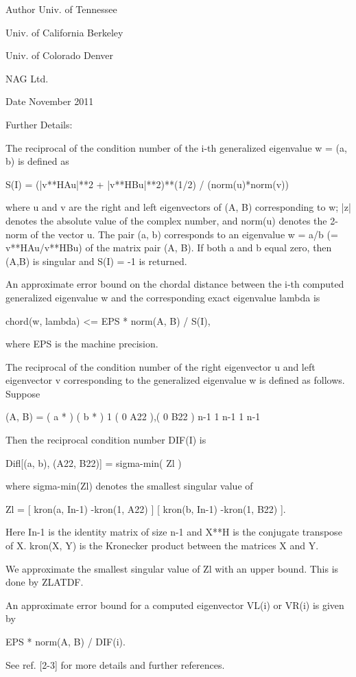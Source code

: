 \begin{DoxyAuthor}{Author}
Univ. of Tennessee 

Univ. of California Berkeley 

Univ. of Colorado Denver 

N\+A\+G Ltd. 
\end{DoxyAuthor}
\begin{DoxyDate}{Date}
November 2011 
\end{DoxyDate}
\begin{DoxyParagraph}{Further Details\+: }
\begin{DoxyVerb}  The reciprocal of the condition number of the i-th generalized
  eigenvalue w = (a, b) is defined as

          S(I) = (|v**HAu|**2 + |v**HBu|**2)**(1/2) / (norm(u)*norm(v))

  where u and v are the right and left eigenvectors of (A, B)
  corresponding to w; |z| denotes the absolute value of the complex
  number, and norm(u) denotes the 2-norm of the vector u. The pair
  (a, b) corresponds to an eigenvalue w = a/b (= v**HAu/v**HBu) of the
  matrix pair (A, B). If both a and b equal zero, then (A,B) is
  singular and S(I) = -1 is returned.

  An approximate error bound on the chordal distance between the i-th
  computed generalized eigenvalue w and the corresponding exact
  eigenvalue lambda is

          chord(w, lambda) <=   EPS * norm(A, B) / S(I),

  where EPS is the machine precision.

  The reciprocal of the condition number of the right eigenvector u
  and left eigenvector v corresponding to the generalized eigenvalue w
  is defined as follows. Suppose

                   (A, B) = ( a   *  ) ( b  *  )  1
                            ( 0  A22 ),( 0 B22 )  n-1
                              1  n-1     1 n-1

  Then the reciprocal condition number DIF(I) is

          Difl[(a, b), (A22, B22)]  = sigma-min( Zl )

  where sigma-min(Zl) denotes the smallest singular value of

         Zl = [ kron(a, In-1) -kron(1, A22) ]
              [ kron(b, In-1) -kron(1, B22) ].

  Here In-1 is the identity matrix of size n-1 and X**H is the conjugate
  transpose of X. kron(X, Y) is the Kronecker product between the
  matrices X and Y.

  We approximate the smallest singular value of Zl with an upper
  bound. This is done by ZLATDF.

  An approximate error bound for a computed eigenvector VL(i) or
  VR(i) is given by

                      EPS * norm(A, B) / DIF(i).

  See ref. [2-3] for more details and further references.\end{DoxyVerb}
 
\end{DoxyParagraph}
